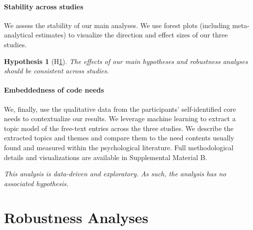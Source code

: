 \documentclass[man, 12pt, a4paper, mask]{apa7}
\theoremstyle{break}
\theoremstyle{plain}
\newtheorem{hyp}{Hypothesis}
\begin{document}
\paragraph{Stability across studies}
We assess the stability of our main analyses. We use forest plots (including meta-analytical estimates) to visualize the direction and effect sizes of our three studies.

\begin{mdframed}[style=mdfhypothesis]
    \begin{hyp}[H\ref{hyp:Stability}] \label{hyp:Stability}
    \addtolength{\leftskip}{1em}
    The effects of our main hypotheses and robustness analyses should be consistent across studies.
    \end{hyp}
\end{mdframed}

\paragraph{Embeddedness of code needs}
We, finally, use the qualitative data from the participants' self-identified core needs to contextualize our results. We leverage machine learning to extract a topic model of the free-text entries across the three studies. We describe the extracted topics and themes and compare them to the need contents usually found and measured within the psychological literature. Full methodological details and visualizations are available in Supplemental Material B.

\begin{mdframed}[style=mdfhypothesis]
    \addtolength{\leftskip}{1em}
    \textit{This analysis is data-driven and exploratory. As such, the analysis has no associated hypothesis.}
\end{mdframed}



\section{Robustness Analyses}
\label{app:AppendixRobustness}
\end{document}

